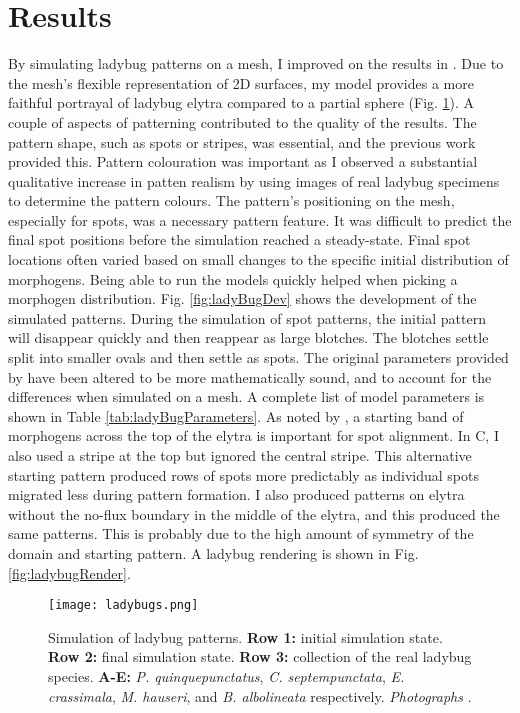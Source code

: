 \section{Results}
By simulating ladybug patterns on a mesh, I improved on the results in \citep{liaw2001}. Due to the mesh's flexible representation of 2D surfaces, my model provides a more faithful portrayal of ladybug elytra compared to a partial sphere (Fig. \ref{fig:ladyBugPatterns}). A couple of aspects of patterning contributed to the quality of the results. The pattern shape, such as spots or stripes, was essential, and the previous work provided this. Pattern colouration was important as I observed a substantial qualitative increase in patten realism by using images of real ladybug specimens to determine the pattern colours. The pattern's positioning on the mesh, especially for spots, was a necessary pattern feature. It was difficult to predict the final spot positions before the simulation reached a steady-state. Final spot locations often varied based on small changes to the specific initial distribution of morphogens. Being able to run the models quickly helped when picking a morphogen distribution. Fig. \ref{fig:ladyBugDev} shows the development of the simulated patterns. During the simulation of spot patterns, the initial pattern will disappear quickly and then reappear as large blotches. The blotches settle split into smaller ovals and then settle as spots. The original parameters provided by \citet{liaw2001} have been altered to be more mathematically sound, and to account for the differences when simulated on a mesh. A complete list of model parameters is shown in Table \ref{tab:ladyBugParameters}. As noted by \citet{liaw2001}, a starting band of morphogens across the top of the elytra is important for spot alignment. In C, I also used a stripe at the top but ignored the central stripe. This alternative starting pattern produced rows of spots more predictably as individual spots migrated less during pattern formation. I also produced patterns on elytra without the no-flux boundary in the middle of the elytra, and this produced the same patterns. This is probably due to the high amount of symmetry of the domain and starting pattern. A ladybug rendering is shown in Fig. \ref{fig:ladybugRender}.

\begin{figure}[ht]
	\centering
	\texttt{[image: ladybugs.png]}
	\caption[Simulation of ladybug patterns]{Simulation of ladybug patterns. \textbf{Row 1:} initial simulation state. \textbf{Row 2:} final simulation state. \textbf{Row 3:} collection of the real ladybug species. \textbf{A-E:} \textit{P. quinquepunctatus}, \textit{C. septempunctata}, \textit{E. crassimala}, \textit{M. hauseri}, and \textit{B. albolineata} respectively. \textit{Photographs} .}
	\label{fig:ladyBugPatterns}
\end{figure}

